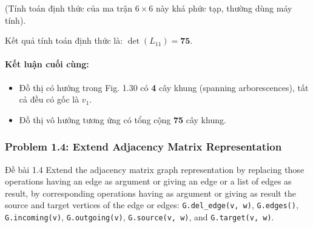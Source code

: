 \documentclass[a4paper,12pt]{article}
\begin{document}
\begin{enumerate}
    (Tính toán định thức của ma trận $6 \times 6$ này khá phức tạp, thường dùng máy tính).
    
    Kết quả tính toán định thức là: $\det(L_{11}) = \mathbf{75}$.
\end{enumerate}

\paragraph{Kết luận cuối cùng:}
\begin{itemize}
    \item Đồ thị có hướng trong Fig. 1.30 có \textbf{4} cây khung (spanning arborescences), tất cả đều có gốc là $v_1$.
    \item Đồ thị vô hướng tương ứng có tổng cộng \textbf{75} cây khung.
\end{itemize}

\subsubsection{Problem 1.4: Extend Adjacency Matrix Representation}
\begin{problembox}{Đề bài 1.4}
    Extend the adjacency matrix graph representation by replacing those operations having an edge as argument or giving an edge or a list of edges as result, by corresponding operations having as argument or giving as result the source and target vertices of the edge or edges: \texttt{G.del\_edge(v, w)}, \texttt{G.edges()}, \texttt{G.incoming(v)}, \texttt{G.outgoing(v)}, \texttt{G.source(v, w)}, and \texttt{G.target(v, w)}.
\end{problembox}
\end{document}
